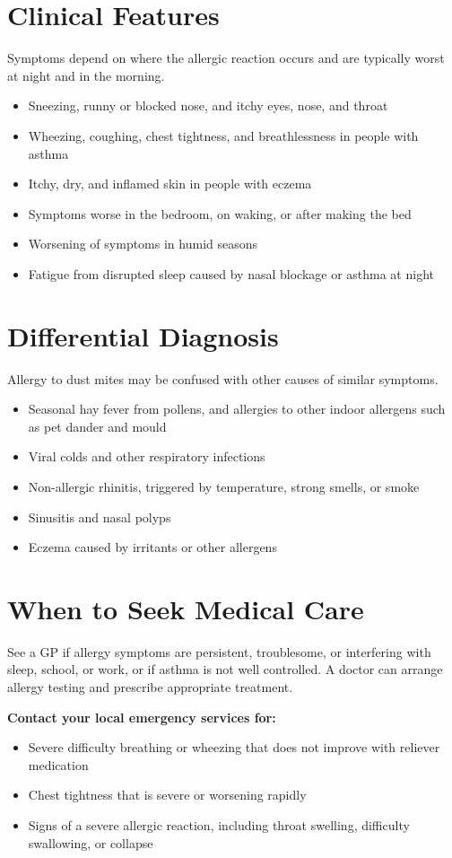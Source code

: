 \section*{Clinical Features}
Symptoms depend on where the allergic reaction occurs and are typically worst at night and in the morning.
\begin{itemize}
    \item Sneezing, runny or blocked nose, and itchy eyes, nose, and throat
    \item Wheezing, coughing, chest tightness, and breathlessness in people with asthma
    \item Itchy, dry, and inflamed skin in people with eczema
    \item Symptoms worse in the bedroom, on waking, or after making the bed
    \item Worsening of symptoms in humid seasons
    \item Fatigue from disrupted sleep caused by nasal blockage or asthma at night
\end{itemize}

\section*{Differential Diagnosis}
Allergy to dust mites may be confused with other causes of similar symptoms.
\begin{itemize}
    \item Seasonal hay fever from pollens, and allergies to other indoor allergens such as pet dander and mould
    \item Viral colds and other respiratory infections
    \item Non-allergic rhinitis, triggered by temperature, strong smells, or smoke
    \item Sinusitis and nasal polyps
    \item Eczema caused by irritants or other allergens
\end{itemize}

\section*{When to Seek Medical Care}
See a GP if allergy symptoms are persistent, troublesome, or interfering with sleep, school, or work, or if asthma is not well controlled. A doctor can arrange allergy testing and prescribe appropriate treatment.

\textbf{Contact your local emergency services for:}
\begin{itemize}
    \item Severe difficulty breathing or wheezing that does not improve with reliever medication
    \item Chest tightness that is severe or worsening rapidly
    \item Signs of a severe allergic reaction, including throat swelling, difficulty swallowing, or collapse
\end{itemize}

